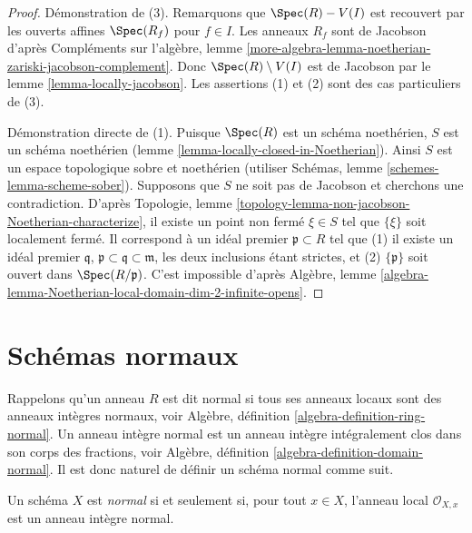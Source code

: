 \begin{proof}
Démonstration de (3). Remarquons que $\Spec(R) - V(I)$ est recouvert par les ouverts
affines $\Spec(R_f)$ pour $f \in I$. Les anneaux $R_f$ sont de Jacobson
d'après Compléments sur l'algèbre, lemme
\ref{more-algebra-lemma-noetherian-zariski-jacobson-complement}.
Donc $\Spec(R) \setminus V(I)$ est de Jacobson par
le lemme \ref{lemma-locally-jacobson}.
Les assertions (1) et (2) sont des cas particuliers de (3).

\medskip\noindent
Démonstration directe de (1).
Puisque $\Spec(R)$ est un schéma noethérien,
$S$ est un schéma noethérien (lemme \ref{lemma-locally-closed-in-Noetherian}).
Ainsi $S$ est un espace topologique sobre et noethérien
(utiliser Schémas, lemme \ref{schemes-lemma-scheme-sober}).
Supposons que $S$ ne soit pas de Jacobson et
cherchons une contradiction.
D'après Topologie, lemme \ref{topology-lemma-non-jacobson-Noetherian-characterize},
il existe un point non fermé $\xi \in S$
tel que $\{\xi\}$ soit localement fermé. Il correspond à un
idéal premier $\mathfrak p \subset R$ tel que (1) il existe un idéal
premier $\mathfrak q$, $\mathfrak p \subset \mathfrak q \subset \mathfrak m$,
les deux inclusions étant strictes, et (2) $\{\mathfrak p\}$ soit ouvert dans
$\Spec(R/\mathfrak p)$. C'est impossible d'après Algèbre,
lemme \ref{algebra-lemma-Noetherian-local-domain-dim-2-infinite-opens}.
\end{proof}







\section{Schémas normaux}
\label{section-normal}

\noindent
Rappelons qu'un anneau $R$ est dit normal si tous ses anneaux locaux sont des
anneaux intègres
normaux, voir Algèbre, définition \ref{algebra-definition-ring-normal}.
Un anneau intègre normal est un anneau intègre intégralement clos dans son
corps des fractions,
voir Algèbre, définition \ref{algebra-definition-domain-normal}.
Il est donc naturel de définir un schéma normal comme suit.

\begin{definition}
\label{definition-normal}
Un schéma $X$ est {\it normal} si et seulement si, pour tout $x \in X$, l'anneau local
$\mathcal{O}_{X, x}$ est un anneau intègre normal.
\end{definition}

